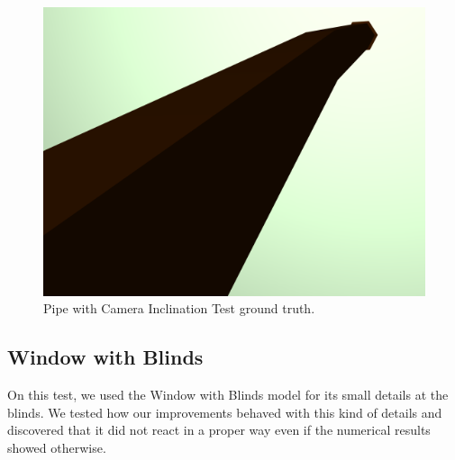 \documentclass{cslthse-msc}
\begin{document}
\begin{figure}[H]
	\centering
	\includegraphics[scale=0.2]{images/results/pipe_with_inclination_sobel_ground_truth.png}
	\caption{Pipe with Camera Inclination Test ground truth.}\label{fig:pipe_inclination_truth}
\end{figure}


\subsection{Window with Blinds}
On this test, we used the Window with Blinds model for its small details at the blinds. We tested how our improvements behaved with this kind of details and discovered that it did not react in a proper way even if the numerical results showed otherwise.
\end{document}
